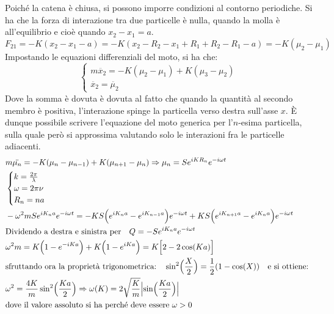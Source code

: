 Poiché la catena è chiusa, si possono imporre condizioni al contorno periodiche.
Si ha che la forza di interazione tra due particelle è nulla, quando la molla è all'equilibrio e cioè quando $x_2-x_1 = a$.
\begin{equation}
F_{21} = - K (x_2 - x_1 - a) = - K (x_2 - R_2 - x_1 + R_1 + R_2 - R_1 - a) = - K (\mu_2 - \mu_1)
\end{equation}
Impostando le equazioni differenziali del moto, si ha che:
\begin{equation}
\begin{cases}
	m \ddot{x_2} = - K (\mu_2 - \mu_1) + K (\mu_3 - \mu_2) \\
	\ddot{x_2} = \ddot{\mu_2}
\end{cases}
\end{equation}
Dove la somma è dovuta è dovuta al fatto che quando la quantità al secondo membro è positiva,
l'interazione spinge la particella verso destra sull'asse $x$.
È dunque possibile scrivere l'equazione del moto generica per l'$n$-esima particella,
sulla quale però si approssima valutando solo le interazioni fra le particelle adiacenti.
\begin{equation}
\begin{split}
& m \ddot{\mu_n} = - K (\mu_n - \mu_{n-1}) + K (\mu_{n+1} - \mu_n) \Rightarrow \mu_n = S e^{ i K R_n } e^{ - i \omega t } \\
& \begin{cases}
	k = \frac{ 2\pi}{\lambda } \\
	\omega = 2\pi \nu \\
	R_n = n a
\end{cases} \\
& - \omega^2 m S e^{ i K_n a } e^{ - i \omega t } = - K S \Bigl(  e^{ i K_n a } - e^{ i K_{n-1} a } \Bigr) e^{ - i \omega t } + K S \Bigl(  e^{ i K_{n+1} a } - e^{ i K_n a }  \Bigr) e^{ - i \omega t }  \\
& \mbox{Dividendo a destra e sinistra per} \quad Q = - S e^{ i K_n a } e^{ - i \omega t } \\
& \omega^2 m = K \Bigl(  1 - e^{ -i K a }  \Bigr) + K \Bigl(  1 - e^{ i K a }  \Bigr) = K \Bigl[ 2 - 2 \cos(K a) \Bigr] \\
& \mbox{sfruttando ora la proprietà trigonometrica:} \quad \sin^2\Bigl(  \frac{ X}{2 }  \Bigr) = \frac{ 1}{2 } ( 1 - \cos(X) ) \quad \mbox{e si ottiene: } \\
& \omega^2 = \frac{ 4K}{m } \sin^2\Bigl(  \frac{ K a}{2 }  \Bigr) \Rightarrow \omega(K) = 2 \sqrt{\frac{ K}{m }} \Bigl|\sin \Bigl(  \frac{ K a}{2 }  \Bigr)\Bigr| \\
& \mbox{dove il valore assoluto si ha perché deve essere } \omega > 0
\end{split}
\end{equation}

